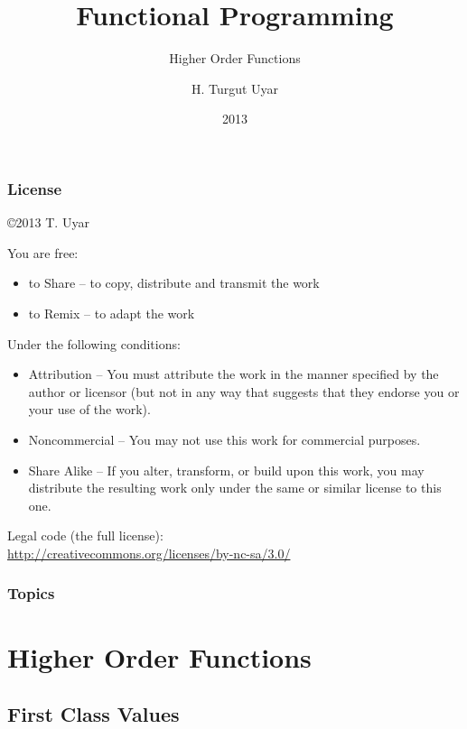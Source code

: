 \documentclass[dvipsnames]{beamer}
\title{Functional Programming}
\subtitle{Higher Order Functions}
\author{H. Turgut Uyar}
\date{2013}
\theoremstyle{plain}
\begin{document}
\begin{frame}
  \titlepage
\end{frame}

\begin{frame}
  \frametitle{License}

  \hfill
  \copyright 2013 T. Uyar

  \vfill
  \begin{tiny}
    You are free:
    \begin{itemize}
      \item to Share -- to copy, distribute and transmit the work
      \item to Remix -- to adapt the work
    \end{itemize}

    Under the following conditions:
    \begin{itemize}
      \item Attribution -- You must attribute the work in the manner specified by
        the author or licensor (but not in any way that suggests that they
        endorse you or your use of the work).

      \item Noncommercial -- You may not use this work for commercial purposes.

      \item Share Alike -- If you alter, transform, or build upon this work, you
        may distribute the resulting work only under the same or similar license
        to this one.
    \end{itemize}
  \end{tiny}

  \vfill
  Legal code (the full license):\\
  \url{http://creativecommons.org/licenses/by-nc-sa/3.0/}
\end{frame}

\begin{frame}
  \frametitle{Topics}
  \tableofcontents
\end{frame}

\section{Higher Order Functions}

\subsection{First Class Values}
\end{document}
